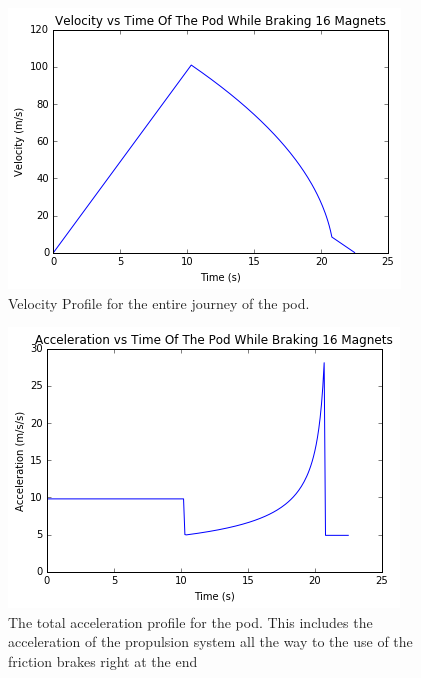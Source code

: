 \documentclass[main.tex]{subfiles}
\begin{document}
    \begin{figure}[H]
        \centering
        \includegraphics[width=\linewidth]{images/totalvelocityprofile}
        \caption{Velocity Profile for the entire journey of the pod.}
        \label{fig:total-velocity-profile}
    \end{figure}
    \begin{figure}[H]
        \centering
        \includegraphics[width=\linewidth]{images/totalaccelerationprofile}
        \caption{The total acceleration profile for the pod. This includes the acceleration of the propulsion system all the way to the use of the friction brakes right at the end}
        \label{fig:total-accelation-profile}
    \end{figure} 
\end{document}
